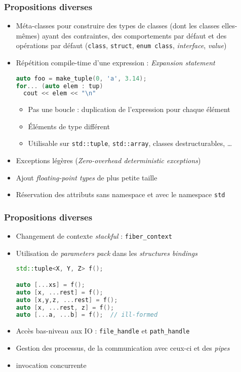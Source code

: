 \documentclass[C++.tex]{subfiles}
\begin{document}
\begin{frame}[fragile]
	\frametitle{Propositions diverses}
	\begin{itemize}
		\item Méta-classes pour construire des types de classes (dont les classes elles-mêmes) ayant des contraintes, des comportements par défaut et des opérations par défaut (\lstinline|class|, \lstinline|struct|, \lstinline|enum class|, \textit{interface}, \textit{value})
		\item Répétition compile-time d'une expression : \textit{Expansion statement}
		
			\begin{lstlisting}[language=C++]
auto foo = make_tuple(0, 'a', 3.14);
for... (auto elem : tup)  
  cout << elem << "\n"\end{lstlisting}
			
			\begin{itemize}
				\item Pas une boucle : duplication de l'expression pour chaque élément
				\item Éléments de type différent
				\item Utilisable sur \lstinline|std::tuple|, \lstinline|std::array|, classes destructurables, \ldots
			\end{itemize}
		\item Exceptions légères (\textit{Zero-overhead deterministic exceptions})
		\item Ajout \textit{floating-point types} de plus petite taille
		\item Réservation des attributs sans namespace et avec le namespace \lstinline|std|

		
	\end{itemize}
\end{frame}

\begin{frame}[fragile]
	\frametitle{Propositions diverses}
	\begin{itemize}
		\item Changement de contexte \textit{stackful} : \lstinline|fiber_context|
		\item Utilisation de \textit{parameters pack} dans les \textit{structures bindings}

			\begin{lstlisting}[language=C++]
std::tuple<X, Y, Z> f();

auto [...xs] = f();
auto [x, ...rest] = f();
auto [x,y,z, ...rest] = f();
auto [x, ...rest, z] = f();
auto [...a, ...b] = f();  // ill-formed\end{lstlisting}


		\item Accès bas-niveau aux IO : \lstinline|file_handle| et \lstinline|path_handle|
		\item Gestion des processus, de la communication avec ceux-ci et des \textit{pipes}
		\item invocation concurrente
	\end{itemize}
\end{frame}
\end{document}

